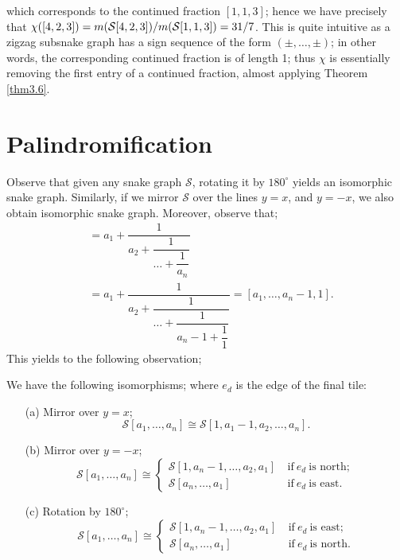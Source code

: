 which corresponds to the continued fraction $[1,1,3]$; hence we have precisely that $\chi([4,2,3]) = m(\mathcal{S}[4,2,3])/m(\mathcal{S}[1,1,3]) = 31/7$. This is quite intuitive as a zigzag subsnake graph has a sign sequence of the form $(\pm,\dots,\pm)$; in other words, the corresponding continued fraction is of length 1; thus $\chi$ is essentially removing the first entry of a continued fraction, almost applying Theorem \ref{thm3.6}.
\section{Palindromification}
Observe that given any snake graph $\mathcal{S}$, rotating it by $180^{\circ}$ yields an isomorphic snake graph. Similarly, if we mirror $\mathcal{S}$ over the lines $y = x$, and $y = -x$, we also obtain isomorphic snake graph. Moreover, observe that;
\begin{align*}
    [a_1,\dots,a_n] &= a_1 + \dfrac{1}{a_2+\dfrac{1}{\dots + \dfrac{1}{a_n}}}\\
    &= a_1 + \dfrac{1}{a_2+\dfrac{1}{\dots + \dfrac{1}{a_n-1 + \dfrac{1}{1} }}}= [a_1,\dots,a_n -1 , 1].
\end{align*}
This yields to the following observation;
\begin{theorem}\label{thm3.8}
    We have the following isomorphisms; where $e_d$ is the edge of the final tile:
\begin{itemize}
    \item[(a)] Mirror over $y=x$;
    \begin{equation*}
        \mathcal{S}[a_1,\dots,a_n] \cong \mathcal{S}[1,a_1-1,a_2,\dots,a_n].
    \end{equation*}
    \item[(b)] Mirror over $y = -x$;
    \begin{equation*}
        \mathcal{S}[a_1,\dots,a_n] \cong 
        \begin{cases}
            \mathcal{S}[1,a_n-1,\dots,a_2,a_1] \ &\text{if} \ e_d \ \text{is north}; \\
            \mathcal{S}[a_n,\dots,a_1] \ &\text{if} \ e_d \ \text{is east.}
        \end{cases}
    \end{equation*}
    \item[(c)] Rotation by $180^{\circ}$;
    \begin{equation*}
        \mathcal{S}[a_1,\dots,a_n] \cong 
        \begin{cases}
            \mathcal{S}[1,a_n-1,\dots,a_2,a_1] \ &\text{if} \ e_d \ \text{is east}; \\
            \mathcal{S}[a_n,\dots,a_1] \ &\text{if} \ e_d \ \text{is north.}
        \end{cases}
    \end{equation*}
\end{itemize}
\end{theorem}
